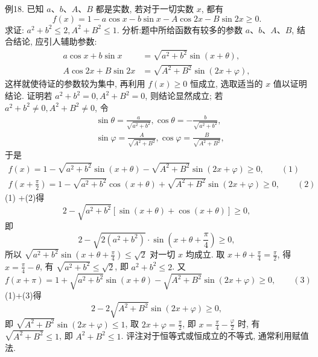 例18. 已知 $a 、 b 、 A 、 B$ 都是实数, 若对于一切实数 $x$, 都有
$$
f(x)=1-a \cos x-b \sin x-A \cos 2 x-B \sin 2 x \geqslant 0 .
$$
求证: $a^2+b^2 \leqslant 2, A^2+B^2 \leqslant 1$.
分析:题中所给函数有较多的参数 $a 、 b 、 A 、 B$, 结合结论, 应引人辅助参数:
$$
\begin{aligned}
a \cos x+b \sin x & =\sqrt{a^2+b^2} \sin (x+\theta), \\
A \cos 2 x+B \sin 2 x & =\sqrt{A^2+B^2} \sin (2 x+\varphi),
\end{aligned}
$$
这样就使待证的参数较为集中, 再利用 $f(x) \geqslant 0$ 恒成立, 选取适当的 $x$ 值以证明结论.
证明若 $a^2+b^2=0, A^2+B^2=0$, 则结论显然成立;
若 $a^2+b^2 \neq 0, A^2+B^2 \neq 0$, 令
$$
\begin{aligned}
& \sin \theta=\frac{a}{\sqrt{a^2+b^2}}, \cos \theta=-\frac{b}{\sqrt{a^2+b^2}}, \\
& \sin \varphi=\frac{A}{\sqrt{A^2+B^2}}, \cos \varphi=\frac{B}{\sqrt{A^2+B^2}},
\end{aligned}
$$
于是
$$
\begin{gathered}
f(x)=1-\sqrt{a^2+b^2} \sin (x+\theta)-\sqrt{A^2+B^2} \sin (2 x+\varphi) \geqslant 0,  \quad\quad(1)\\
f\left(x+\frac{\pi}{2}\right)=1-\sqrt{a^2+b^2} \cos (x+\theta)+\sqrt{A^2+B^2} \sin (2 x+\varphi) \geqslant 0,  \quad\quad(2)
\end{gathered}
$$
(1) +(2)得
$$
2-\sqrt{a^2+b^2}[\sin (x+\theta)+\cos (x+\theta)] \geqslant 0,
$$
即
$$
2-\sqrt{2\left(a^2+b^2\right)} \cdot \sin \left(x+\theta+\frac{\pi}{4}\right) \geqslant 0,
$$
所以 $\sqrt{a^2+b^2} \sin \left(x+\theta+\frac{\pi}{4}\right) \leqslant \sqrt{2}$ 对一切 $x$ 均成立.
取 $x+\theta+\frac{\pi}{4}=\frac{\pi}{2}$, 得 $x=\frac{\pi}{4}-\theta$, 有 $\sqrt{a^2+b^2} \leqslant \sqrt{2}$, 即 $a^2+b^2 \leqslant 2$.
又
$$
f(x+\pi)=1+\sqrt{a^2+b^2} \sin (x+\theta)-\sqrt{A^2+B^2} \sin (2 x+\varphi) \geqslant 0,  \quad\quad(3)
$$
(1)+(3)得
$$
2-2 \sqrt{A^2+B^2} \sin (2 x+\varphi) \geqslant 0,
$$
即 $\sqrt{A^2+B^2} \sin (2 x+\varphi) \leqslant 1$, 取 $2 x+\varphi=\frac{\pi}{2}$, 即 $x=\frac{\pi}{4}-\frac{\varphi}{2}$ 时, 有 $\sqrt{A^2+B^2} \leqslant 1$, 即 $A^2+B^2 \leqslant 1$.
评注对于恒等式或恒成立的不等式, 通常利用赋值法.



